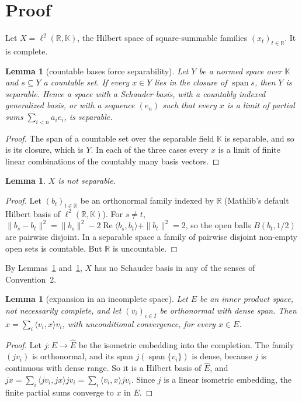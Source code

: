 \documentclass[11pt]{article}
\newtheorem{lemma}[theorem]{Lemma}
\theoremstyle{definition}
\newcommand{\K}{\mathbb{K}}
\newcommand{\ip}[2]{\langle #1,#2\rangle}
\begin{document}
\section{Proof}

Let $X=\ell^2(\mathbb{R},\K)$, the Hilbert space of square-summable families
$(x_t)_{t\in\mathbb{R}}$. It is complete.

\begin{lemma}[countable bases force separability]\label{l:sep}
Let $Y$ be a normed space over $\K$ and $s\subseteq Y$ a countable set. If every $x\in Y$ lies in
the closure of $\operatorname{span}s$, then $Y$ is separable. Hence a space with a Schauder basis,
with a countably indexed generalized basis, or with a sequence $(e_n)$ such that every $x$ is a
limit of partial sums $\sum_{i<n}a_ie_i$, is separable.
\end{lemma}
\begin{proof}
The span of a countable set over the separable field $\K$ is separable, and so is its closure,
which is $Y$. In each of the three cases every $x$ is a limit of finite linear combinations of the
countably many basis vectors.
\end{proof}

\begin{lemma}\label{l:nonsep}
$X$ is not separable.
\end{lemma}
\begin{proof}
Let $(b_t)_{t\in\mathbb{R}}$ be an orthonormal family indexed by $\mathbb{R}$ (Mathlib's default
Hilbert basis of $\ell^2(\mathbb{R},\K)$). For $s\ne t$,
$\|b_s-b_t\|^2=\|b_s\|^2-2\operatorname{Re}\ip{b_s}{b_t}+\|b_t\|^2=2$, so the open balls
$B(b_t,1/2)$ are pairwise disjoint. In a separable space a family of pairwise disjoint non-empty open
sets is countable. But $\mathbb{R}$ is uncountable.
\end{proof}

By Lemmas~\ref{l:sep} and~\ref{l:nonsep}, $X$ has no Schauder basis in any of the senses of
Convention~2.

\begin{lemma}[expansion in an incomplete space]\label{l:exp}
Let $E$ be an inner product space, not necessarily complete, and let $(v_i)_{i\in I}$ be orthonormal
with dense span. Then $x=\sum_i\ip{v_i}{x}v_i$, with unconditional convergence, for every $x\in E$.
\end{lemma}
\begin{proof}
Let $j:E\to\widehat E$ be the isometric embedding into the completion. The family $(j v_i)$ is
orthonormal, and its span $j(\operatorname{span}\{v_i\})$ is dense, because $j$ is continuous with
dense range. So it is a Hilbert basis of $\widehat E$, and $jx=\sum_i\ip{jv_i}{jx}jv_i
=\sum_i\ip{v_i}{x}jv_i$. Since $j$ is a linear isometric embedding, the finite partial sums
converge to $x$ in $E$.
\end{proof}
\end{document}
